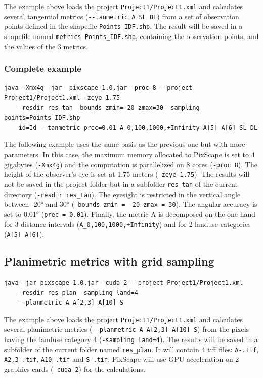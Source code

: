 \documentclass{report}
\begin{document}
The example above loads the project \verb|Project1/Project1.xml| and calculates several tangential metrics (\verb|--tanmetric A SL DL|) from a set of observation points defined in the shapefile \verb|Points_IDF.shp|. The result will be saved in a shapefile named \verb|metrics-Points_IDF.shp|, containing the observation points, and the values of the 3 metrics.

\subsubsection{Complete example}
\begin{Verbatim}
java -Xmx4g -jar  pixscape-1.0.jar -proc 8 --project Project1/Project1.xml -zeye 1.75
	-resdir res_tan -bounds zmin=-20 zmax=30 -sampling points=Points_IDF.shp 
	id=Id --tanmetric prec=0.01 A_0,100,1000,+Infinity A[5] A[6] SL DL
\end{Verbatim}

The following example uses the same basis as the previous one but with more parameters. In this case, the maximum memory allocated to PixScape is set to 4 gigabytes (\verb|-Xmx4g|) and the computation is parallelized on 8 cores (\verb|-proc 8|). The height of the observer's eye is set at 1.75 meters (\verb|-zeye 1.75|). The results will not be saved in the project folder but in a subfolder \verb|res_tan| of the current directory (\verb|-resdir res_tan|). The eyesight is restricted in the vertical angle between -20° and 30° (\verb|-bounds zmin = -20 zmax = 30|). The angular accuracy is set to 0.01° (\verb|prec = 0.01|). Finally, the metric A is decomposed on the one hand for 3 distance intervals (\verb|A_0,100,1000,+Infinity|) and for 2 landuse categories (\verb|A[5] A[6]|).

\subsection{Planimetric metrics with grid sampling}
\begin{Verbatim}
java -jar pixscape-1.0.jar -cuda 2 --project Project1/Project1.xml
	-resdir res_plan -sampling land=4 
	--planmetric A A[2,3] A[10] S
\end{Verbatim}
The example above loads the project \verb|Project1/Project1.xml| and calculates several planimetric metrics (\verb|--planmetric A A[2,3] A[10] S|) from the pixels having the landuse category 4 (\verb|-sampling land=4|). The results will be saved in a subfolder of the current folder named \verb|res_plan|. It will contain 4 tiff files: \verb|A-.tif|, \verb|A2,3-.tif|, \verb|A10-.tif| and \verb|S-.tif|. PixScape will use GPU acceleration on 2 graphics cards (\verb|-cuda 2|) for the calculations.
\end{document}
